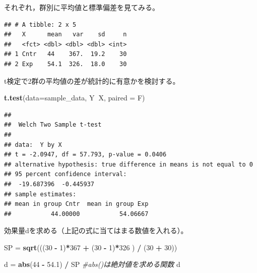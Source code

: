 \documentclass[]{article}
\newenvironment{Shaded}{\begin{snugshade}}{\end{snugshade}}
\newcommand{\KeywordTok}[1]{\textcolor[rgb]{0.13,0.29,0.53}{\textbf{#1}}}
\newcommand{\DataTypeTok}[1]{\textcolor[rgb]{0.13,0.29,0.53}{#1}}
\newcommand{\DecValTok}[1]{\textcolor[rgb]{0.00,0.00,0.81}{#1}}
\newcommand{\FloatTok}[1]{\textcolor[rgb]{0.00,0.00,0.81}{#1}}
\newcommand{\StringTok}[1]{\textcolor[rgb]{0.31,0.60,0.02}{#1}}
\newcommand{\CommentTok}[1]{\textcolor[rgb]{0.56,0.35,0.01}{\textit{#1}}}
\newcommand{\OperatorTok}[1]{\textcolor[rgb]{0.81,0.36,0.00}{\textbf{#1}}}
\newcommand{\NormalTok}[1]{#1}
\begin{document}
それぞれ，群別に平均値と標準偏差を見てみる。

\begin{Shaded}
\end{Shaded}

\begin{verbatim}
## # A tibble: 2 x 5
##   X      mean   var    sd     n
##   <fct> <dbl> <dbl> <dbl> <int>
## 1 Cntr   44    367.  19.2    30
## 2 Exp    54.1  326.  18.0    30
\end{verbatim}

t検定で2群の平均値の差が統計的に有意かを検討する。

\begin{Shaded}
\begin{Highlighting}[]
\KeywordTok{t.test}\NormalTok{(}\DataTypeTok{data=}\NormalTok{sample_data, Y}\OperatorTok{~}\NormalTok{X, }\DataTypeTok{paired =}\NormalTok{ F)}
\end{Highlighting}
\end{Shaded}

\begin{verbatim}
## 
##  Welch Two Sample t-test
## 
## data:  Y by X
## t = -2.0947, df = 57.793, p-value = 0.0406
## alternative hypothesis: true difference in means is not equal to 0
## 95 percent confidence interval:
##  -19.687396  -0.445937
## sample estimates:
## mean in group Cntr  mean in group Exp 
##           44.00000           54.06667
\end{verbatim}

効果量dを求める（上記の式に当てはまる数値を入れる）。

\begin{Shaded}
\begin{Highlighting}[]
\NormalTok{SP =}\StringTok{ }\KeywordTok{sqrt}\NormalTok{(((}\DecValTok{30} \OperatorTok{-}\StringTok{ }\DecValTok{1}\NormalTok{)}\OperatorTok{*}\DecValTok{367} \OperatorTok{+}\StringTok{ }\NormalTok{(}\DecValTok{30} \OperatorTok{-}\StringTok{ }\DecValTok{1}\NormalTok{)}\OperatorTok{*}\DecValTok{326}\NormalTok{ ) }\OperatorTok{/}\StringTok{ }\NormalTok{(}\DecValTok{30} \OperatorTok{+}\StringTok{ }\DecValTok{30}\NormalTok{))}

\NormalTok{d =}\StringTok{ }\KeywordTok{abs}\NormalTok{(}\DecValTok{44} \OperatorTok{-}\StringTok{ }\FloatTok{54.1}\NormalTok{) }\OperatorTok{/}\StringTok{ }\NormalTok{SP }\CommentTok{#abs()は絶対値を求める関数}
\NormalTok{d}
\end{Highlighting}
\end{Shaded}
\end{document}
